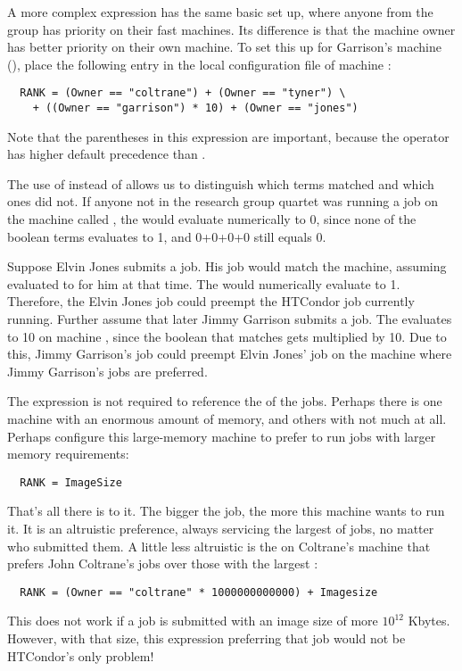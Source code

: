 A more complex  expression
has the same basic set up,
where anyone from the group has priority on their fast machines.
Its difference is that
the machine owner has better priority on their own machine.
To set this up for Garrison's machine (),
place the following entry in the local configuration file 
of machine :
\begin{verbatim}
  RANK = (Owner == "coltrane") + (Owner == "tyner") \
    + ((Owner == "garrison") * 10) + (Owner == "jones")
\end{verbatim}
Note that the parentheses in this expression are important, because 
the \Expr{+} operator has higher default precedence than \Expr{==}.

The use of \Expr{+} instead of \Expr{||} allows us to 
distinguish which terms matched and which ones did not.
If anyone not in the research group quartet was running a job on
the machine called \Expr{bass},
the  would evaluate numerically to 0, since none
of the boolean terms evaluates to 1, and 0+0+0+0 still equals 0.

Suppose Elvin Jones submits a job.
His job would match the  machine,
assuming  evaluated to  for him at that time.
The \MacroNI{RANK} would numerically evaluate to 1.
Therefore, the Elvin Jones job could preempt the HTCondor job currently running.
Further assume that later Jimmy Garrison submits a job.
The  evaluates to 10 on machine , 
since the boolean that matches gets multiplied by 10.
Due to this, Jimmy Garrison's job could preempt Elvin Jones' job
on the \Expr{bass} machine where Jimmy Garrison's jobs are preferred.

The  expression is not required to reference the
 of the jobs.
Perhaps there is one machine with an enormous amount of memory,
and others with not much at all.
Perhaps configure this
large-memory machine to prefer to run jobs with larger memory
requirements:
\begin{verbatim}
  RANK = ImageSize
\end{verbatim}

That's all there is to it.
The bigger the job, the more this machine wants to run it.
It is an altruistic preference, always servicing
the largest of jobs, no matter who submitted them.
A little less altruistic is the  on Coltrane's machine that
prefers John Coltrane's jobs over those with the largest
:
\begin{verbatim}
  RANK = (Owner == "coltrane" * 1000000000000) + Imagesize
\end{verbatim}
This  does not work if a job is submitted with an image
size of more $10^{12}$ Kbytes.
However, with that size, this  expression
preferring that job would not be HTCondor's
only problem! 


